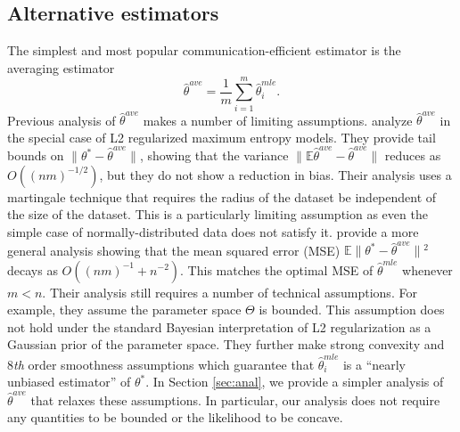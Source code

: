 \documentclass[twoside]{article}
\newcommand{\E}{\mathbb{E}}
\newcommand{\w}{\theta}
\newcommand{\wave}{\hat\w^{ave}}
\newcommand{\wmle}{\hat\w^{mle}}
\newcommand{\wstar}{{\w^{*}}}
\newcommand{\ltwo}[1]{{\lVert {#1} \rVert}}
\begin{document}
\subsection{Alternative estimators}
\label{sec:alt}
The simplest and most popular communication-efficient estimator is the averaging estimator
\begin{equation}
\wave = \frac{1}{m}\sum_{i=1}^m \wmle_i
.
\end{equation}
Previous analysis of $\wave$ makes a number of limiting assumptions.
\cite{mcdonald2009efficient} analyze $\wave$ in the special case of L2 regularized maximum entropy models.
They provide tail bounds on $\ltwo{\wstar-\wave}$, showing that the variance $\ltwo{\E\wave-\wave}$ reduces as $O((nm)^{-1/2})$,
but they do not show a reduction in bias.
Their analysis uses a martingale technique that requires the radius of the dataset be independent of the size of the dataset.
This is a particularly limiting assumption as even the simple case of
normally-distributed data does not satisfy it.
\cite{zhang2012communication} provide a more general analysis showing that the mean squared error (MSE) $\E\ltwo{\wstar-\wave}{}^2$ decays as $O((nm)^{-1} + n^{-2})$.
This matches the optimal MSE of $\wmle$ whenever $m<n$.
Their analysis still requires a number of technical assumptions.
For example, they assume the parameter space $\Theta$ is bounded.
This assumption does not hold under the standard Bayesian interpretation of L2 regularization as a Gaussian prior of the parameter space.
They further make strong convexity and 8\emph{th} order smoothness assumptions which guarantee that $\wmle_i$ is a ``nearly unbiased estimator'' of $\wstar$.
In Section \ref{sec:anal}, we provide a simpler analysis of $\wave$ that relaxes these assumptions.
In particular, our analysis does not require any quantities to be bounded or the likelihood to be concave.
\end{document}
